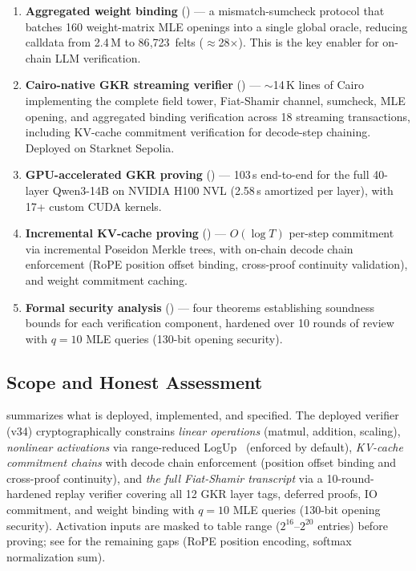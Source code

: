\documentclass[10pt,twocolumn]{article}
\theoremstyle{definition}
\theoremstyle{remark}
\begin{document}
\begin{enumerate}[nosep,leftmargin=1.4em]
  \item \textbf{Aggregated weight binding} () ---
        a mismatch-sumcheck protocol that batches 160 weight-matrix
        MLE openings into a single global oracle, reducing calldata
        from 2.4\,M to 86{,}723~felts ($\approx$28$\times$).
        This is the key enabler for on-chain LLM verification.
  \item \textbf{Cairo-native GKR streaming verifier}
        () --- $\sim$14\,K lines of Cairo
        implementing the complete field tower, Fiat-Shamir channel,
        sumcheck, MLE opening, and aggregated binding verification
        across 18 streaming transactions, including KV-cache
        commitment verification for decode-step chaining.
        Deployed on Starknet Sepolia.
  \item \textbf{GPU-accelerated GKR proving}
        () --- 103\,s end-to-end for the full 40-layer
        Qwen3-14B on NVIDIA H100 NVL (2.58\,s amortized per layer),
        with 17+ custom CUDA kernels.
  \item \textbf{Incremental KV-cache proving}
        () --- $O(\log T)$ per-step commitment
        via incremental Poseidon Merkle trees, with on-chain
        decode chain enforcement (RoPE position offset binding,
        cross-proof continuity validation), and weight commitment
        caching.
  \item \textbf{Formal security analysis} () ---
        four theorems establishing soundness bounds for each
        verification component, hardened over 10 rounds of review
        with $q\!=\!10$ MLE queries (130-bit opening security).
\end{enumerate}

\subsection{Scope and Honest Assessment}

 summarizes what is deployed, implemented, and
specified.
The deployed verifier (v34) cryptographically constrains
\emph{linear operations} (matmul, addition, scaling),
\emph{nonlinear activations} via range-reduced
LogUp~\cite{habock2022logup} (enforced by default),
\emph{KV-cache commitment chains} with decode chain enforcement
(position offset binding and cross-proof continuity),
and \emph{the full Fiat-Shamir transcript} via a 10-round-hardened
replay verifier covering all 12 GKR layer tags, deferred proofs,
IO commitment, and weight binding with $q\!=\!10$ MLE queries
(130-bit opening security).
Activation inputs are masked to table range ($2^{16}$--$2^{20}$
entries) before proving; see  for the
remaining gaps (RoPE position encoding, softmax normalization sum).
\end{document}

